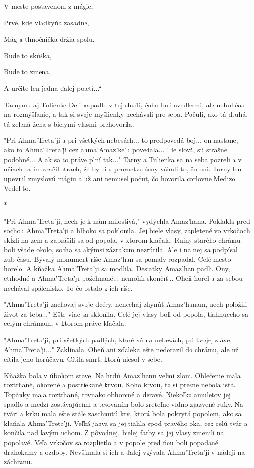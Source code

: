 \documentclass{book}
\begin{document}
V meste postavenom z mágie,

Prvé, kde vládkyňa zasadne,

Mág a tlmočníčka držia spolu,

Bude to skúška,

Bude to zmena,

A určite len jedna ďalej poletí...“

Tarnymu aj Tulienke Deli napadlo v tej chvíli, čoho boli svedkami, ale nebol čas na rozmýšľanie, a tak si svoje myšlienky nechávali pre seba. Počuli, ako tá druhá, tá zelená žena s bielymi vlasmi prehovorila.

"$ $Pri Ahma'Treta'ji a pri všetkých nebesách... to predpovedá boj... on nastane, ako to Ahma'Treta'ji cez ahma'Amaz'ke'u povedala... Tie slová, sú strašne podobné... A ak sa to práve plní tak..."$ $ Tarny a Tulienka sa na seba pozreli a v očiach sa im zračil strach, že by si v proroctve ženy všimli to, čo oni. Tarny len upevnil zmyslovú mágiu a už ani nemusel počuť, čo hovorila corlovne Medizo. Vedel to.

\begin{center}
*
\end{center}

"$ $Pri Ahma'Treta'ji, nech je k nám milostivá,"$ $ vydýchla Amaz'hana. Pokľakla pred sochou Ahma'Treta'ji a hlboko sa poklonila. Jej biele vlasy, zapletené vo vrkočoch skĺzli na zem a zaprášili sa od popola, v ktorom kľačala. Ruiny starého chrámu boli všade okolo, socha sa akýmsi zázrakom nezrútila. Ale i na nej sa podpísal zub času. Bývalý monument ríše Amaz'han sa pomaly rozpadal. Celé mesto horelo. A kňažka Ahma'Treta'ji sa modlila. Desiatky Amaz'han padli. Ony, ctihodné a Ahma'Treta'ji požehnané... nemohli skončiť... Oheň horel a za sebou nechával spálenisko. To čo ostalo z ich ríše.

"$ $Ahma'Treta'ji zachovaj svoje dcéry, nenechaj zhynúť Amaz'hanam, nech položili život za teba..."$ $ Ešte viac sa sklonila. Celé jej vlasy boli od popola, tiahnuceho sa celým chrámom, v ktorom práve kľačala.

"$ $Ahma'Treta'ji, pri všetkých padlých, ktoré sú na nebesách, pri tvojej sláve, Ahma'Treta'ji..."$ $ Zaklínala. Oheň ani zďaleka ešte nedorazil do chrámu, ale už cítila jeho horúčavu. Cítila smrť, ktorú niesol v sebe.

Kňažka bola v úbohom stave. Na hrdú Amaz'hanu veľmi zlom. Oblečenie mala roztrhané, ohorené a postriekané krvou. Koho krvou, to si presne nebola istá. Topánky mala roztrhané, rovnako obhorené a deravé. Niekoľko amuletov jej spadlo a medzi zostávajúcimi a tetovaním bolo zreteľne vidno zjazvené ruky. Na tvári a krku mala ešte stále zaschnutú krv, ktorá bola pokrytá popolom, ako sa klaňala Ahma'Treta'ji. Veľká jazva sa jej tiahla spod pravého oka, cez celú tvár a končila nad ľavým uchom. Z pôvodnej, bielej farby sa jej vlasy zmenili na popolavé. Veľa vrkočov sa rozplietlo a v popole pred ňou boli popadané drahokamy a ozdoby. Nevšímala si ich a ďalej vzývala Ahma'Treta'ji v nádeji na záchranu.
\end{document}
